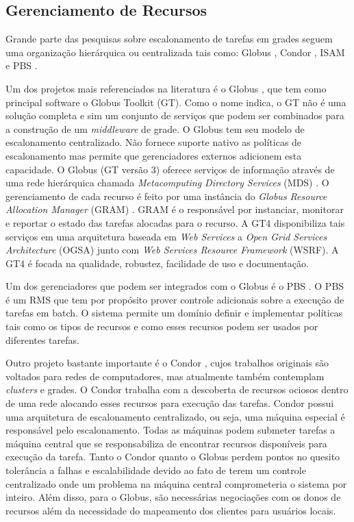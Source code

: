\subsection{Gerenciamento de Recursos}
Grande parte das pesquisas sobre escalonamento de tarefas em grades seguem uma organização hierárquica ou centralizada tais como: Globus \cite{Foster1998}, Condor \cite{condor2007}, ISAM \cite{isam} e PBS \cite{Bayucan1998}.

Um dos projetos mais referenciados na literatura é o Globus \cite{Globus}, que tem como principal software o Globus Toolkit (GT). Como o nome indica, o GT não é uma solução completa e sim um conjunto de serviços que podem ser combinados para a construção de um \emph{middleware} de grade. O Globus \cite{Foster1998} tem seu modelo de escalonamento centralizado. Não fornece suporte nativo as políticas de escalonamento mas permite que gerenciadores externos adicionem esta capacidade. O Globus (GT versão 3) oferece serviços de informação através de uma rede hierárquica chamada \emph{Metacomputing Directory Services} (MDS) \cite{Santos}. O gerenciamento de cada recurso é feito por uma instância do {\it Globus Resource Allocation Manager} (GRAM) \cite{Andrade2002}. GRAM é o responsável por instanciar, monitorar e reportar o estado das tarefas alocadas para o recurso. A GT4 \cite{Leon2006} disponibiliza tais serviços em uma arquitetura baseada em {\it Web Services} a {\it Open Grid Services Architecture} (OGSA) junto com {\it Web Services Resource Framework} (WSRF). A GT4 é focada na qualidade, robustez, facilidade de uso e documentação.

Um dos gerenciadores que podem ser integrados com o Globus é o PBS \cite{Bayucan1998}. O PBS é um RMS que tem por propósito prover controle adicionais sobre a execução de tarefas em batch. O sistema permite um domínio definir e implementar políticas tais como os tipos de recursos e como esses recursos podem ser usados por diferentes tarefas.

Outro projeto bastante importante é o Condor \cite{condor2007}, cujos trabalhos originais são voltados para redes de computadores, mas atualmente também contemplam {\it clusters} e grades. O Condor trabalha com a descoberta de recursos ociosos dentro de uma rede alocando esses recursos para execução das tarefas. Condor possui uma arquitetura de escalonamento centralizado, ou seja, uma máquina especial é responsável pelo escalonamento. Todas as máquinas podem submeter tarefas a máquina central que se responsabiliza de encontrar recursos disponíveis para execução da tarefa. Tanto o Condor quanto o Globus perdem pontos no quesito tolerância a falhas e escalabilidade devido ao fato de terem um controle centralizado onde um problema na máquina central comprometeria o sistema por inteiro. Além disso, para o Globus, são necessárias negociações com os donos de recursos além da necessidade do mapeamento dos clientes para usuários locais.

